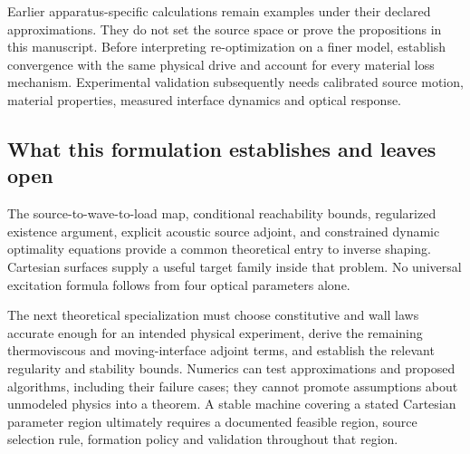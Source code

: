 Earlier apparatus-specific calculations remain examples under their declared
approximations. They do not set the source space or prove the propositions in
this manuscript. Before interpreting re-optimization on a finer model, establish
convergence with the same physical drive and account for every material loss
mechanism. Experimental validation subsequently needs calibrated source motion,
material properties, measured interface dynamics and optical response.

\subsection{What this formulation establishes and leaves open}
The source-to-wave-to-load map, conditional reachability bounds, regularized
existence argument, explicit acoustic source adjoint, and constrained dynamic
optimality equations provide a common theoretical entry to inverse shaping.
Cartesian surfaces supply a useful target family inside that problem. No
universal excitation formula follows from four optical parameters alone.

The next theoretical specialization must choose constitutive and wall laws
accurate enough for an intended physical experiment, derive the remaining
thermoviscous and moving-interface adjoint terms, and establish the relevant
regularity and stability bounds. Numerics can test approximations and proposed
algorithms, including their failure cases; they cannot promote assumptions
about unmodeled physics into a theorem. A stable machine covering a stated
Cartesian parameter region ultimately requires a documented feasible region,
source selection rule, formation policy and validation throughout that region.
